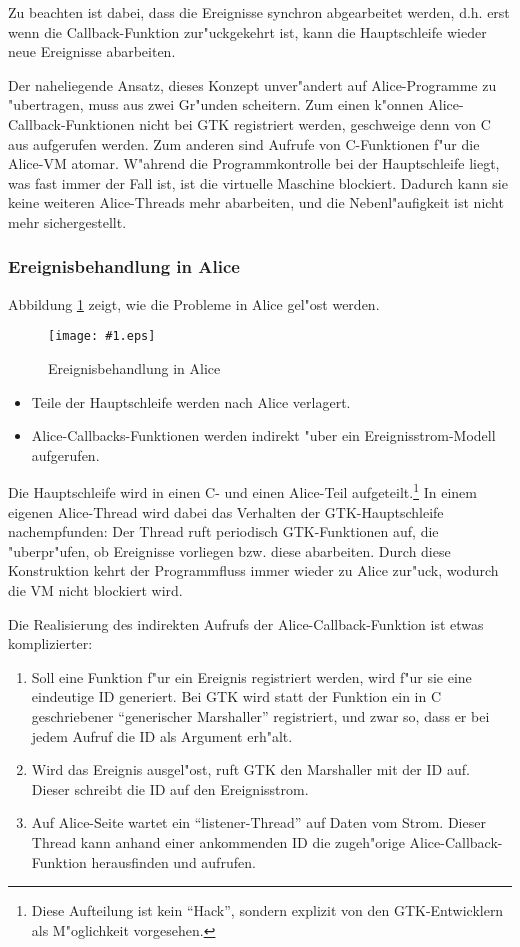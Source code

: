 \documentclass[a4paper,titlepage]{article}
\newcommand{\showimage}[1]{\begin{center}\texttt{[image: \#1.eps]}\end{center}}
\begin{document}
Zu beachten ist dabei, dass die Ereignisse synchron abgearbeitet werden,
d.h. erst wenn die Callback-Funktion zur"uckgekehrt ist, kann die Hauptschleife
wieder neue Ereignisse abarbeiten.

Der naheliegende Ansatz, dieses Konzept unver"andert auf Alice-Programme
zu "ubertragen, muss aus zwei Gr"unden scheitern.
Zum einen k"onnen Alice-Callback-Funktionen nicht bei GTK registriert werden,
geschweige denn von C aus aufgerufen werden.
Zum anderen sind Aufrufe von C-Funktionen f"ur die Alice-VM atomar. 
W"ahrend die
Programmkontrolle bei der Hauptschleife liegt, was fast immer der Fall ist,
ist die virtuelle Maschine blockiert. Dadurch kann sie keine weiteren
Alice-Threads mehr abarbeiten, und die Nebenl"aufigkeit ist nicht mehr
sichergestellt.


\subsubsection*{Ereignisbehandlung in Alice}

Abbildung \ref{EventsAlice} zeigt, wie die Probleme in Alice gel"ost werden.
\begin{figure}
\showimage{events-alice}
\caption{Ereignisbehandlung in Alice}
\label{EventsAlice}
\end{figure}

\begin{itemize}
\item Teile der Hauptschleife werden nach Alice verlagert.
\item Alice-Callbacks-Funktionen werden indirekt "uber ein Ereignisstrom-Modell
      aufgerufen.
\end{itemize}

Die Hauptschleife wird in einen C- und einen Alice-Teil aufgeteilt.\footnote{
Diese Aufteilung ist kein ``Hack'', sondern explizit von den
GTK-Entwicklern als M"oglichkeit vorgesehen.}
In einem eigenen Alice-Thread wird dabei das Verhalten
der GTK-Hauptschleife nachempfunden: Der Thread ruft periodisch
GTK-Funktionen auf, die "uberpr"ufen, ob Ereignisse vorliegen bzw. diese
abarbeiten. Durch diese Konstruktion kehrt der Programmfluss immer wieder
zu Alice zur"uck, wodurch die VM nicht blockiert wird.

Die Realisierung des indirekten Aufrufs der Alice-Callback-Funktion 
ist etwas komplizierter:

\begin{enumerate}
\item Soll eine Funktion f"ur ein Ereignis registriert werden,
      wird f"ur sie eine eindeutige ID generiert. 
      Bei GTK wird statt der Funktion ein in C geschriebener
      ``generischer Marshaller'' registriert, und zwar so, dass er bei jedem
      Aufruf die ID als Argument erh"alt.
\item Wird das Ereignis ausgel"ost, ruft GTK den Marshaller mit der ID auf.
      Dieser schreibt die ID auf den Ereignisstrom.
\item Auf Alice-Seite wartet ein ``listener-Thread'' auf Daten vom Strom.
      Dieser Thread kann anhand einer ankommenden ID die zugeh"orige
      Alice-Callback-Funktion herausfinden und aufrufen.
\end{enumerate}
\end{document}
